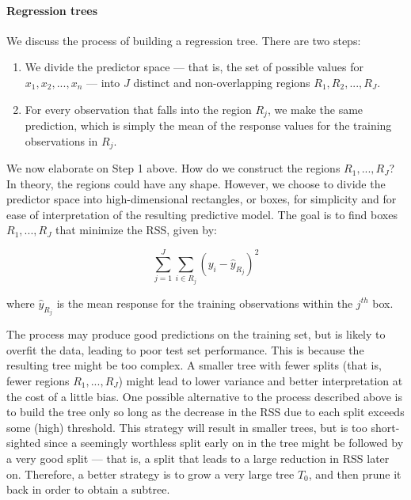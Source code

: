 \paragraph{Regression trees}
We discuss the process of building a regression tree. There are two steps:
\begin{enumerate}
    \item We divide the predictor space --- that is, the set of possible values for $x_1, x_2, ...,
x_n$ --- into $J$ distinct and non-overlapping regions $R_1, R_2, ..., R_J$.
    \item For every observation that falls into the region $R_j$, we make the same prediction, which
is simply the mean of the response values for the training observations in $R_j$.
\end{enumerate}

We now elaborate on Step 1 above. How do we construct the regions $R_1, ..., R_J$? In theory, the
regions could have any shape. However, we choose to divide the predictor space into high-dimensional
rectangles, or boxes, for simplicity and for ease of interpretation of the resulting predictive
model. The goal is to find boxes $R_1, ..., R_J$ that minimize the RSS, given by:

$$\sum_{j=1}^{J} \sum_{i \in R_j} (y_i - \hat{y}_{R_j})^2$$

where $\hat{y}_{R_j}$ is the mean response for the training observations within the $j^{th}$ box.

The process may produce good predictions on the training set, but is likely to overfit the data,
leading to poor test set performance. This is because the resulting tree might be too complex. A
smaller tree with fewer splits (that is, fewer regions $R_1, ..., R_J$) might lead to lower variance
and better interpretation at the cost of a little bias. One possible alternative to the process
described above is to build the tree only so long as the decrease in the RSS due to each split
exceeds some (high) threshold. This strategy will result in smaller trees, but is too short-sighted
since a seemingly worthless split early on in the tree might be followed by a very good split — that
is, a split that leads to a large reduction in RSS later on. Therefore, a better strategy is to grow
a very large tree $T_0$, and then prune it back in order to obtain a subtree.

